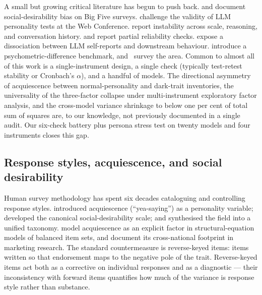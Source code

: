 A small but growing critical literature has begun to push back. \citet{acerbi2024llm} and \citet{salecha2024llm} document social-desirability bias on Big Five surveys. \citet{suhr2025challenging} challenge the validity of LLM personality tests at the Web Conference. \citet{pelet2025persistent} report instability across scale, reasoning, and conversation history. \citet{hagendorff2024machine} and \citet{schaekermann2024personality} report partial reliability checks. \citet{han2025personality} expose a dissociation between LLM self-reports and downstream behaviour. \citet{xie2025aipsychobench} introduce a psychometric-difference benchmark, and~\citet{chen2025humanizing} survey the area. Common to almost all of this work is a single-instrument design, a single check (typically test-retest stability or Cronbach's $\alpha$), and a handful of models. The directional asymmetry of acquiescence between normal-personality and dark-trait inventories, the universality of the three-factor collapse under multi-instrument exploratory factor analysis, and the cross-model variance shrinkage to below one per cent of total sum of squares are, to our knowledge, not previously documented in a single audit. Our six-check battery plus persona stress test on twenty models and four instruments closes this gap.

\subsection{Response styles, acquiescence, and social desirability}
\label{sec:related-styles}

Human survey methodology has spent six decades cataloguing and controlling response styles. \citet{couch1960yeasayers} introduced acquiescence (``yea-saying'') as a personality variable; \citet{crowne1960social} developed the canonical social-desirability scale; and \citet{paulhus1991response} synthesised the field into a unified taxonomy. \citet{billiet2000modeling} model acquiescence as an explicit factor in structural-equation models of balanced item sets, and \citet{baumgartner2007modeling} document its cross-national footprint in marketing research. The standard countermeasure is reverse-keyed items: items written so that endorsement maps to the negative pole of the trait. Reverse-keyed items act both as a corrective on individual responses and as a diagnostic --- their inconsistency with forward items quantifies how much of the variance is response style rather than substance.

